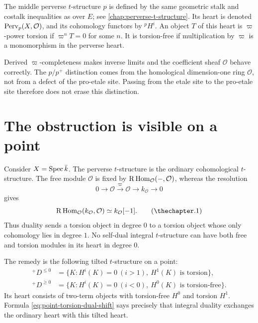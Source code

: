 The middle perverse \(t\)-structure \(p\) is defined by the same geometric
stalk and costalk inequalities as over \(E\); see
\cref{chap:perverse-t-structure}.  Its heart is denoted
\(\operatorname{Perv}_p(X,\mathcal O)\), and its cohomology functors by
\({}^p\!H^i\).  An object \(T\) of this heart is \(\varpi\)-power torsion if
\(\varpi^nT=0\) for some \(n\).  It is torsion-free if multiplication by
\(\varpi\) is a monomorphism in the perverse heart.

\begin{warning}
Derived \(\varpi\)-completeness makes inverse limits and the coefficient
sheaf \(\mathcal O\) behave correctly.  The \(p/p^+\) distinction comes from
the homological dimension-one ring \(\mathcal O\), not from a defect of the
pro-etale site.  Passing from the etale site to the pro-etale site therefore
does not erase this distinction.
\end{warning}

\section{The obstruction is visible on a point}

Consider \(X=\operatorname{Spec}\bar k\).  The perverse \(t\)-structure is the ordinary
cohomological \(t\)-structure.  The free module \(\mathcal O\) is fixed by
\(\mathrm R\operatorname{Hom}_{\mathcal O}(-,\mathcal O)\), whereas the resolution
\[
  0\longrightarrow\mathcal O\xrightarrow{\ \varpi\ }\mathcal O
    \longrightarrow k_{\mathcal O}\longrightarrow0
\]
gives
\[
  \R\Hom_{\mathcal O}(k_{\mathcal O},\mathcal O)\simeq
  k_{\mathcal O}[-1].
\tag{\thechapter.1}\label{eq:point-torsion-dual-shift}
\]
Thus duality sends a torsion object in degree \(0\) to a torsion object whose
only cohomology lies in degree \(1\).  No self-dual integral \(t\)-structure
can have both free and torsion modules in its heart in degree \(0\).

The remedy is the following tilted \(t\)-structure on a point:
\begin{align*}
 {}^{+}D^{\leq0}
   &=\{K:H^i(K)=0\ (i>1),\ H^1(K)\text{ is torsion}\},\\
 {}^{+}D^{\geq0}
   &=\{K:H^i(K)=0\ (i<0),\ H^0(K)\text{ is torsion-free}\}.
\end{align*}
Its heart consists of two-term objects with torsion-free \(H^0\) and
torsion \(H^1\).  Formula \eqref{eq:point-torsion-dual-shift} says precisely
that integral duality exchanges the ordinary heart with this tilted heart.

